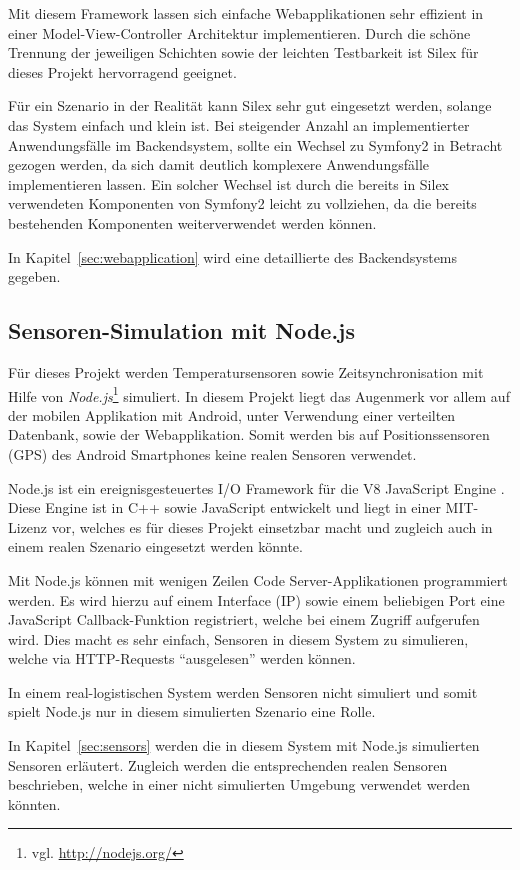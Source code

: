 Mit diesem Framework lassen sich einfache Webapplikationen sehr effizient in einer
	Model-View-Controller Architektur implementieren. Durch die schöne Trennung der
	jeweiligen Schichten sowie der leichten Testbarkeit ist Silex für dieses
	Projekt hervorragend geeignet.
	
Für ein Szenario in der Realität kann Silex sehr gut eingesetzt werden, solange das
	System einfach und klein ist. Bei steigender Anzahl an implementierter
	Anwendungsfälle im Backendsystem, sollte ein Wechsel zu Symfony2 in Betracht
	gezogen werden, da sich damit deutlich komplexere Anwendungsfälle
	implementieren lassen. Ein solcher
	Wechsel ist durch die bereits in Silex verwendeten Komponenten von Symfony2
	leicht zu vollziehen, da die bereits bestehenden Komponenten weiterverwendet
	werden können.
	
In Kapitel~\ref{sec:webapplication} wird eine detaillierte des Backendsystems
	gegeben.

\subsection{Sensoren-Simulation mit Node.js}
\label{subsec:nodejs}

Für dieses Projekt werden Temperatursensoren sowie Zeitsynchronisation mit
	Hilfe von \emph{Node.js}\footnote{vgl. \url{http://nodejs.org/}} simuliert.
	In diesem Projekt liegt das Augenmerk vor allem auf der mobilen Applikation
	mit Android, unter Verwendung einer verteilten Datenbank, sowie der
	Webapplikation. Somit werden bis auf Positionssensoren (GPS) des Android
	Smartphones keine realen Sensoren verwendet.

Node.js ist ein ereignisgesteuertes I/O Framework für die V8 JavaScript
	Engine \cite{Wikipedia10a}. Diese Engine ist in C++ sowie JavaScript entwickelt
	und liegt in einer MIT-Lizenz vor, welches es für dieses Projekt einsetzbar
	macht und zugleich auch in einem realen Szenario eingesetzt werden könnte.

Mit Node.js können mit wenigen Zeilen Code Server-Applikationen programmiert
	werden. Es wird hierzu auf einem Interface (IP) sowie einem beliebigen Port
	eine JavaScript Callback-Funktion registriert, welche bei einem Zugriff
	aufgerufen wird. Dies macht es sehr einfach, Sensoren in diesem System zu
	simulieren, welche via HTTP-Requests ``ausgelesen'' werden können.
	
In einem real-logistischen System werden Sensoren nicht simuliert und somit
	spielt Node.js nur in diesem simulierten Szenario eine Rolle.
	
In Kapitel~\ref{sec:sensors} werden die in diesem System mit Node.js simulierten
	Sensoren erläutert. Zugleich werden die entsprechenden realen Sensoren
	beschrieben, welche in einer nicht simulierten Umgebung verwendet werden
	könnten.